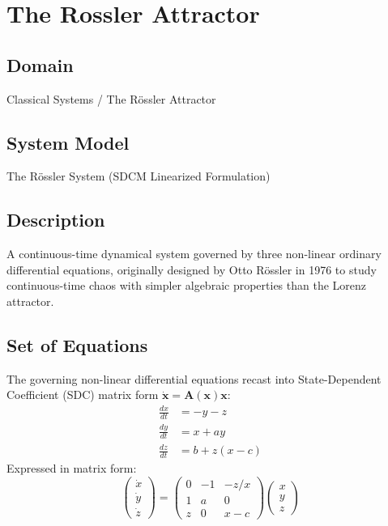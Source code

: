 \chapter{The Rossler Attractor}

\section{Domain}
Classical Systems / The R\"ossler Attractor

\section{System Model}
The R\"ossler System (SDCM Linearized Formulation)

\section{Description}
A continuous-time dynamical system governed by three non-linear ordinary differential equations, originally designed by Otto R\"ossler in 1976 to study continuous-time chaos with simpler algebraic properties than the Lorenz attractor.

\section{Set of Equations}
The governing non-linear differential equations recast into State-Dependent Coefficient (SDC) matrix form $\dot{\mathbf{x}} = \mathbf{A}(\mathbf{x})\mathbf{x}$:
\begin{align}
\frac{dx}{dt} &= -y - z \\
\frac{dy}{dt} &= x + a y \\
\frac{dz}{dt} &= b + z(x - c)
\end{align}
Expressed in matrix form:
\begin{equation}
\begin{pmatrix} \dot{x} \\ \dot{y} \\ \dot{z} \end{pmatrix} = \begin{pmatrix} 0 & -1 & -z/x \\ 1 & a & 0 \\ z & 0 & x - c \end{pmatrix} \begin{pmatrix} x \\ y \\ z \end{pmatrix}
\end{equation}

